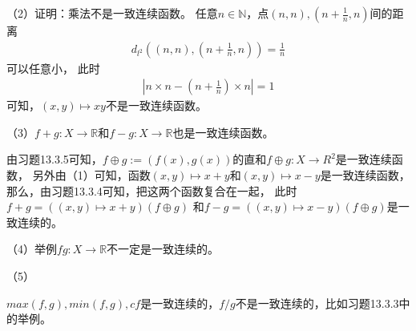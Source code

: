 \documentclass{article}
\begin{document}
（2）证明：乘法不是一致连续函数。
任意$n \in \mathbb{N}$，点$(n, n), (n + \frac{1}{n}, n)$间的距离
\begin{align*}
  d_{l^2}((n, n), (n + \frac{1}{n}, n)) = \frac{1}{n}
\end{align*}
可以任意小，
此时
\begin{align*}
  |n \times n - (n + \frac{1}{n}) \times n| = 1
\end{align*}
可知，$(x, y) \mapsto xy$不是一致连续函数。

（3）$f + g: X \to \mathbb{R}$和$f - g: X \to \mathbb{R}$也是一致连续函数。

由习题13.3.5可知，$f \oplus g := (f(x), g(x))$的直和$f \oplus g: X \to R^2$是一致连续函数，
另外由（1）可知，函数$(x, y) \mapsto x + y$和$(x, y) \mapsto x - y$是一致连续函数，
那么，由习题13.3.4可知，把这两个函数复合在一起，
此时$f + g = ((x, y) \mapsto x + y)(f \oplus g)$
和$f - g = ((x, y) \mapsto x - y)(f \oplus g)$是一致连续的。

（4）举例$fg: X \to \mathbb{R}$不一定是一致连续的。


（5）

$max(f,g), min(f,g), cf$是一致连续的，$f/g$不是一致连续的，比如习题13.3.3中的举例。
\end{document}
